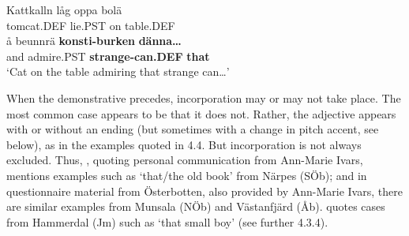 
\ea\label{}
\gll Kattkalln  låg  oppa  bolä\\
tomcat.DEF  lie.PST  on  table.DEF\\
\gll å  beunnrä  \textbf{konsti-burken}\textbf{  dänna…}\\
and  admire.PST  \textbf{strange-can.DEF} \textbf{that}\\
\glt ‘Cat on the table admiring that strange can…’
\z

When the demonstrative precedes, incorporation may or may not take place. The most common case appears to be that it does not. Rather, the adjective appears with or without an ending (but sometimes with a change in pitch accent, see below), as in the examples quoted in 4.4. But incorporation is not always excluded. Thus, \citet[159]{Vangsnes2003}, quoting personal communication from Ann-Marie Ivars, mentions examples such as ‘that/the old book’ from Närpes (SÖb); and in questionnaire material from Österbotten, also provided by Ann-Marie Ivars, there are similar examples from Munsala (NÖb) and Västanfjärd (Åb). \citet[38]{Reinhammar2005} quotes cases from Hammerdal (Jm) such as ‘that small boy’ (see further 4.3.4).


